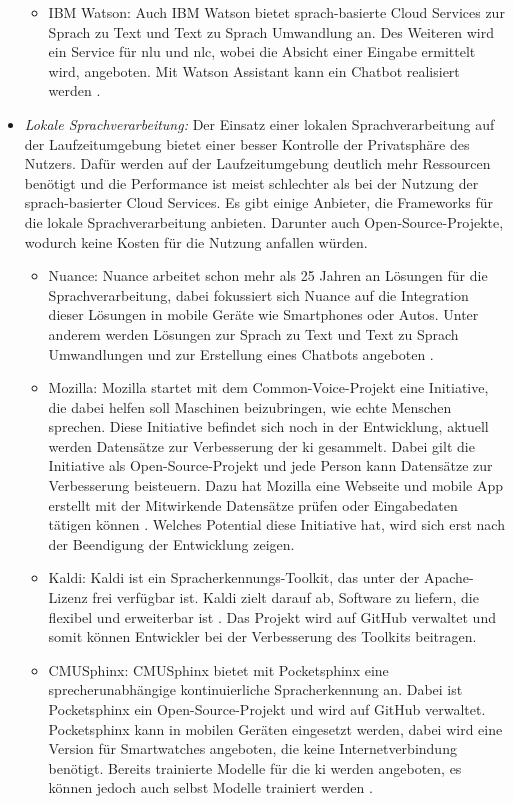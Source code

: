 \begin{itemize}
\begin{itemize}
		\item IBM Watson: Auch IBM Watson bietet sprach-basierte Cloud Services zur Sprach zu Text und Text zu Sprach Umwandlung an. Des Weiteren wird ein Service für \ac{nlu} und \ac{nlc}, wobei die Absicht einer Eingabe ermittelt wird, angeboten. Mit Watson Assistant kann ein Chatbot realisiert werden \cite{IBMWatsonSpeechServices}.
	\end{itemize}
	\item \textsl{Lokale Sprachverarbeitung:} Der Einsatz einer lokalen Sprachverarbeitung auf der Laufzeitumgebung bietet einer besser Kontrolle der Privatsphäre des Nutzers. Dafür werden auf der Laufzeitumgebung deutlich mehr Ressourcen benötigt und die Performance ist meist schlechter als bei der Nutzung der sprach-basierter Cloud Services. Es gibt einige Anbieter, die Frameworks für die lokale Sprachverarbeitung anbieten. Darunter auch Open-Source-Projekte, wodurch keine Kosten für die Nutzung anfallen würden. 
	\begin{itemize}
		\item Nuance: Nuance arbeitet schon mehr als 25 Jahren an Lösungen für die Sprachverarbeitung, dabei fokussiert sich Nuance auf die Integration dieser Lösungen in mobile Geräte wie Smartphones oder Autos. Unter anderem werden Lösungen zur Sprach zu Text und Text zu Sprach Umwandlungen und zur Erstellung eines Chatbots angeboten \cite{Nuance}. 
		\item Mozilla: Mozilla startet mit dem Common-Voice-Projekt eine Initiative, die dabei helfen soll Maschinen beizubringen, wie echte Menschen sprechen. Diese Initiative befindet sich noch in der Entwicklung, aktuell werden Datensätze zur Verbesserung der \ac{ki} gesammelt. Dabei gilt die Initiative als Open-Source-Projekt und jede Person kann Datensätze zur Verbesserung beisteuern. Dazu hat Mozilla eine Webseite und mobile App erstellt mit der Mitwirkende Datensätze prüfen oder Eingabedaten tätigen können \cite{MozillaCommonVoice}. Welches Potential diese Initiative hat, wird sich erst nach der Beendigung der Entwicklung zeigen.
		\item Kaldi: Kaldi ist ein Spracherkennungs-Toolkit, das unter der Apache-Lizenz frei verfügbar ist. Kaldi zielt darauf ab, Software zu liefern, die flexibel und erweiterbar ist \cite{Kaldi}. Das Projekt wird auf GitHub verwaltet und somit können Entwickler bei der Verbesserung des Toolkits beitragen.
		\item CMUSphinx: CMUSphinx bietet mit Pocketsphinx eine sprecherunabhängige kontinuierliche Spracherkennung an. Dabei ist Pocketsphinx ein Open-Source-Projekt und wird auf GitHub verwaltet. Pocketsphinx kann in mobilen Geräten eingesetzt werden, dabei wird eine Version für Smartwatches angeboten, die keine Internetverbindung benötigt. Bereits trainierte Modelle für die \ac{ki} werden angeboten, es können jedoch auch selbst Modelle trainiert werden \cite{Pocketsphinx}.
	\end{itemize}
\end{itemize}

